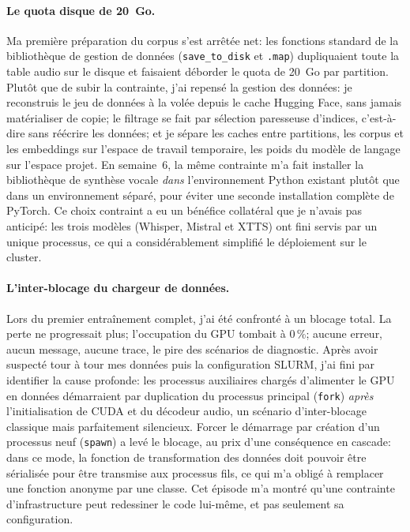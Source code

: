 \documentclass[11pt,a4paper]{article}
\begin{document}
\paragraph{Le quota disque de 20~Go.} Ma première préparation du corpus s'est arrêtée net: les fonctions standard de la bibliothèque de gestion de données (\texttt{save\_to\_disk} et \texttt{.map}) dupliquaient toute la table audio sur le disque et faisaient déborder le quota de 20~Go par partition. Plutôt que de subir la contrainte, j'ai repensé la gestion des données: je reconstruis le jeu de données à la volée depuis le cache Hugging Face, sans jamais matérialiser de copie; le filtrage se fait par sélection paresseuse d'indices, c'est-à-dire sans réécrire les données; et je sépare les caches entre partitions, les corpus et les embeddings sur l'espace de travail temporaire, les poids du modèle de langage sur l'espace projet. En semaine~6, la même contrainte m'a fait installer la bibliothèque de synthèse vocale \emph{dans} l'environnement Python existant plutôt que dans un environnement séparé, pour éviter une seconde installation complète de PyTorch. Ce choix contraint a eu un bénéfice collatéral que je n'avais pas anticipé: les trois modèles (Whisper, Mistral et XTTS) ont fini servis par un unique processus, ce qui a considérablement simplifié le déploiement sur le cluster. 

\paragraph{L'inter-blocage du chargeur de données.} Lors du premier entraînement complet, j'ai été confronté à un blocage total. La perte ne progressait plus; l'occupation du GPU tombait à 0\,\%; aucune erreur, aucun message, aucune trace, le pire des scénarios de diagnostic. Après avoir suspecté tour à tour mes données puis la configuration SLURM, j'ai fini par identifier la cause profonde: les processus auxiliaires chargés d'alimenter le GPU en données démarraient par duplication du processus principal (\texttt{fork}) \emph{après} l'initialisation de CUDA et du décodeur audio, un scénario d'inter-blocage classique mais parfaitement silencieux. Forcer le démarrage par création d'un processus neuf (\texttt{spawn}) a levé le blocage, au prix d'une conséquence en cascade: dans ce mode, la fonction de transformation des données doit pouvoir être sérialisée pour être transmise aux processus fils, ce qui m'a obligé à remplacer une fonction anonyme par une classe. Cet épisode m'a montré qu'une contrainte d'infrastructure peut redessiner le code lui-même, et pas seulement sa configuration. 
\end{document}
